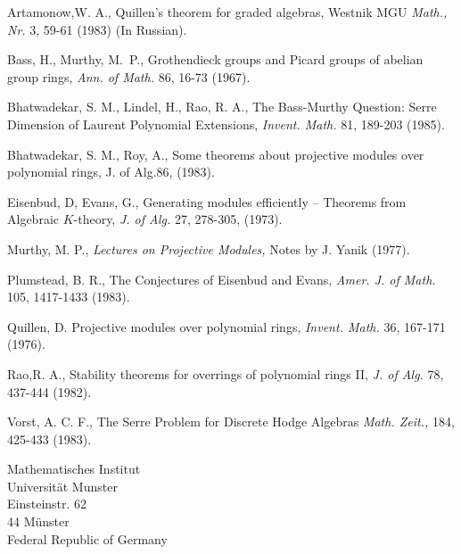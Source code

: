 \begin{thebibliography}{}
 Artamonow,\pageoriginale W. A., Quillen's theorem for graded
algebras, Westnik MGU {\em Math., Nr.} 3, 59-61 (1983) (In Russian).

 Bass, H., Murthy, M.~P., Grothendieck groups
and Picard groups of abelian group rings, {\em Ann. of Math.} 86,
16-73 (1967).

 Bhatwadekar, S. M., Lindel, H., Rao, R. A.,
The Bass-Murthy Question: Serre Dimension of Laurent Polynomial
Extensions, {\em Invent. Math.} 81, 189-203 (1985). 

 Bhatwadekar, S. M., Roy, A., Some theorems
about projective modules over polynomial rings, {\rm J. of Alg.86}, (1983).

 Eisenbud, D, Evans, G., Generating modules
efficiently -- Theorems from Algebraic $K$-theory, {\em J. of Alg.}
27, 278-305, (1973).

 Murthy, M. P., {\em Lectures on Projective
Modules,} Notes by J. Yanik (1977). 

 Plumstead, B. R., The Conjectures of Eisenbud and
Evans, {\em Amer. J. of Math.} 105, 1417-1433 (1983).

 Quillen, D. Projective modules over polynomial
rings, {\em Invent. Math.} 36, 167-171 (1976).

 Rao,\pageoriginale R. A., Stability theorems for overrings of
polynomial rings II, {\em J. of Alg.} 78, 437-444 (1982).

 Vorst, A. C. F., The Serre Problem for Discrete
Hodge Algebras {\em Math. Zeit.,} 184, 425-433 (1983).
\end{thebibliography}


\vskip 1cm

\noindent
Mathematisches Institut\\
Universit\"at Munster\\
Einsteinstr. 62\\
44 M\"unster\\
Federal Republic of Germany

\newpage

~\phantom{a}
\thispagestyle{empty}


